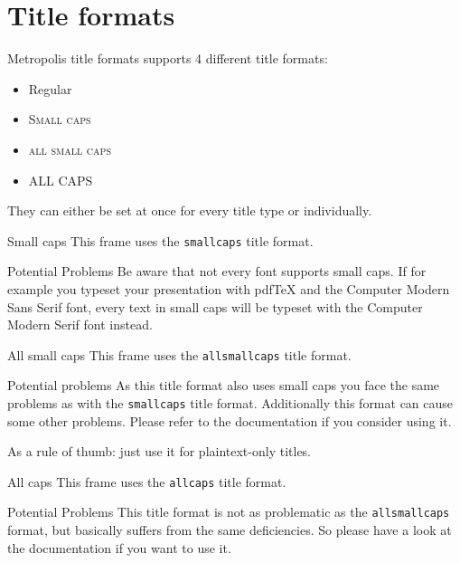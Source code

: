 \section{Title formats}

\begin{frame}{Metropolis title formats}
	\themename supports 4 different title formats:
	\begin{itemize}
		\item Regular
		\item \textsc{Small caps}
		\item \textsc{all small caps}
		\item ALL CAPS
	\end{itemize}
	They can either be set at once for every title type or individually.
\end{frame}

{
\begin{frame}{Small caps}
	This frame uses the \texttt{smallcaps} title format.

	\begin{alertblock}{Potential Problems}
		Be aware that not every font supports small caps. If for example you typeset your presentation with pdfTeX and the Computer Modern Sans Serif font, every text in small caps will be typeset with the Computer Modern Serif font instead.
	\end{alertblock}
\end{frame}
}

{
\begin{frame}{All small caps}
	This frame uses the \texttt{allsmallcaps} title format.

	\begin{alertblock}{Potential problems}
		As this title format also uses small caps you face the same problems as with the \texttt{smallcaps} title format. Additionally this format can cause some other problems. Please refer to the documentation if you consider using it.

		As a rule of thumb: just use it for plaintext-only titles.
	\end{alertblock}
\end{frame}
}

{
\begin{frame}{All caps}
	This frame uses the \texttt{allcaps} title format.

	\begin{alertblock}{Potential Problems}
		This title format is not as problematic as the \texttt{allsmallcaps} format, but basically suffers from the same deficiencies. So please have a look at the documentation if you want to use it.
	\end{alertblock}
\end{frame}
}